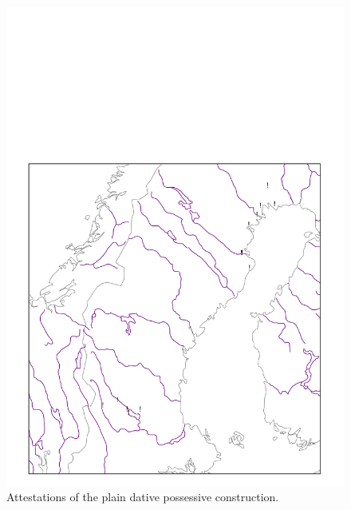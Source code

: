 {\begin{figure}[h]
\includegraphics[height=.3\textheight]{figures/22_Attestationsoftheplain}
\caption{Attestations of the plain dative possessive construction.}
\label{map:18}

\end{figure}

}
